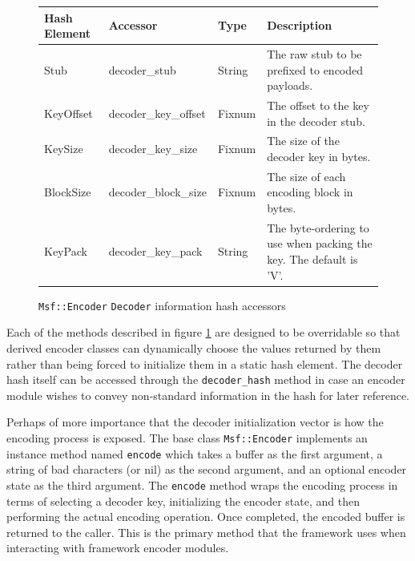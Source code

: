 \documentclass{report}
\begin{document}
\begin{figure}[h]
\begin{center}
\begin{tabular}{|l|l|l|p{2.0in}|}
\hline
\textbf{Hash Element} & \textbf{Accessor} & \textbf{Type} & \textbf{Description} \\
\hline
Stub & decoder\_stub & String & The raw stub to be prefixed to encoded payloads. \\
\hline
KeyOffset & decoder\_key\_offset & Fixnum & The offset to the key in the decoder stub. \\
\hline
KeySize & decoder\_key\_size & Fixnum & The size of the decoder key in bytes. \\
\hline
BlockSize & decoder\_block\_size & Fixnum & The size of each encoding block in bytes. \\
\hline
KeyPack & decoder\_key\_pack & String & The byte-ordering to use when packing the key.  The default is 'V'. \\
\hline
\end{tabular}
\caption{\texttt{Msf::Encoder} \texttt{Decoder} information hash
accessors} \label{fig-table-encoder-hash}
\end{center}
\end{figure}

\par
Each of the methods described in figure \ref{fig-table-encoder-hash}
are designed to be overridable so that derived encoder classes can
dynamically choose the values returned by them rather than being
forced to initialize them in a static hash element.  The decoder
hash itself can be accessed through the \texttt{decoder\_hash}
method in case an encoder module wishes to convey non-standard
information in the hash for later reference.

\par
Perhaps of more importance that the decoder initialization vector is
how the encoding process is exposed.  The base class
\texttt{Msf::Encoder} implements an instance method named
\texttt{encode} which takes a buffer as the first argument, a string
of bad characters (or nil) as the second argument, and an optional
encoder state as the third argument.  The \texttt{encode} method
wraps the encoding process in terms of selecting a decoder key,
initializing the encoder state, and then performing the actual
encoding operation.  Once completed, the encoded buffer is returned
to the caller.  This is the primary method that the framework uses
when interacting with framework encoder modules.
\end{document}
